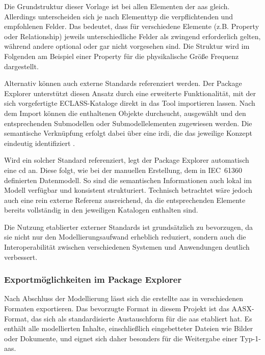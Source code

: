 Die Grundstruktur dieser Vorlage ist bei allen Elementen der \acs{aas} gleich.
Allerdings unterscheiden sich je nach Elementtyp die verpflichtenden und empfohlenen Felder.
Das bedeutet, dass für verschiedene Elemente (z.B. Property oder Relationship) jeweils unterschiedliche Felder als zwingend erforderlich gelten, während andere optional oder gar nicht vorgesehen sind.
Die Struktur wird im Folgenden am Beispiel einer Property für die physikalische Größe Frequenz dargestellt.



Alternativ können auch externe Standards referenziert werden. 
Der Package Explorer unterstützt diesen Ansatz durch eine erweiterte Funktionalität, mit der sich vorgefertigte ECLASS-Kataloge direkt in das Tool importieren lassen. 
Nach dem Import können die enthaltenen Objekte durchsucht, ausgewählt und den entsprechenden Submodellen oder Submodellelementen zugewiesen werden. 
Die semantische Verknüpfung erfolgt dabei über eine \acs{irdi}, die das jeweilige Konzept eindeutig identifiziert \cite{eclass_irdi}. 

Wird ein solcher Standard referenziert, legt der Package Explorer automatisch eine \acs{cd} an.
Diese folgt, wie bei der manuellen Erstellung, dem in IEC~61360 definierten Datenmodell.  
So sind die semantischen Informationen auch lokal im Modell verfügbar und konsistent strukturiert.
Technisch betrachtet wäre jedoch auch eine rein externe Referenz ausreichend, da die entsprechenden Elemente bereits vollständig in den jeweiligen Katalogen enthalten sind.

Die Nutzung etablierter externer Standards ist grundsätzlich zu bevorzugen, da sie nicht nur den Modellierungsaufwand erheblich reduziert, sondern auch die Interoperabilität zwischen verschiedenen Systemen und Anwendungen deutlich verbessert.

\subsubsection*{Exportmöglichkeiten im Package Explorer}
\vspace{-0.5em}
Nach Abschluss der Modellierung lässt sich die erstellte \acs{aas} in verschiedenen Formaten exportieren.
Das bevorzugte Format in diesem Projekt ist das AASX-Format, das sich als standardisierte Austauschform für die \acs{aas} etabliert hat.
Es enthält alle modellierten Inhalte, einschließlich eingebetteter Dateien wie Bilder oder Dokumente, und eignet sich daher besonders für die Weitergabe einer Typ-1-\acs{aas}.

